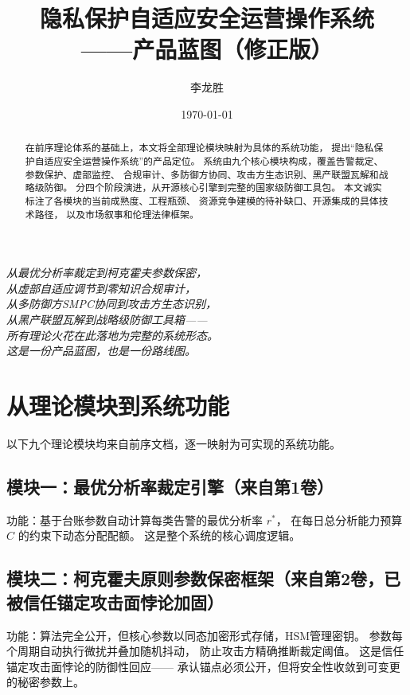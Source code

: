 \documentclass[11pt,a4paper]{article}
\title{隐私保护自适应安全运营操作系统\\
——产品蓝图（修正版）}
\author{李龙胜}
\date{\today}
\begin{document}
\maketitle

\begin{center}
\textit{
从最优分析率裁定到柯克霍夫参数保密，\\
从虚部自适应调节到零知识合规审计，\\
从多防御方SMPC协同到攻击方生态识别，\\
从黑产联盟瓦解到战略级防御工具箱——\\
所有理论火花在此落地为完整的系统形态。\\
这是一份产品蓝图，也是一份路线图。
}
\end{center}

\vspace{5mm}

\begin{abstract}
在前序理论体系的基础上，本文将全部理论模块映射为具体的系统功能，
提出“隐私保护自适应安全运营操作系统”的产品定位。
系统由九个核心模块构成，覆盖告警裁定、参数保护、虚部监控、
合规审计、多防御方协同、攻击方生态识别、黑产联盟瓦解和战略级防御。
分四个阶段演进，从开源核心引擎到完整的国家级防御工具包。
本文诚实标注了各模块的当前成熟度、工程瓶颈、
资源竞争建模的待补缺口、开源集成的具体技术路径，
以及市场叙事和伦理法律框架。
\end{abstract}

\tableofcontents

\section{从理论模块到系统功能}

以下九个理论模块均来自前序文档，逐一映射为可实现的系统功能。

\subsection{模块一：最优分析率裁定引擎（来自第1卷）}

功能：基于台账参数自动计算每类告警的最优分析率 \(r^*\)，
在每日总分析能力预算 \(C\) 的约束下动态分配配额。
这是整个系统的核心调度逻辑。

\subsection{模块二：柯克霍夫原则参数保密框架（来自第2卷，已被信任锚定攻击面悖论加固）}

功能：算法完全公开，但核心参数以同态加密形式存储，HSM管理密钥。
参数每个周期自动执行微扰并叠加随机抖动，
防止攻击方精确推断裁定阈值。
这是信任锚定攻击面悖论的防御性回应——
承认锚点必须公开，但将安全性收敛到可变更的秘密参数上。
\end{document}
